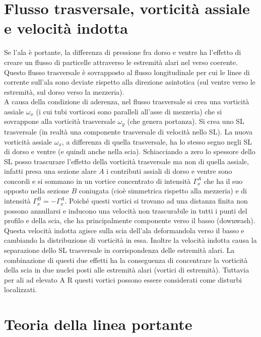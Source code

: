 \documentclass[11pt,a4paper]{report}
\newcommand{\sz}[1]{\scriptsize #1\normalsize}
\begin{document}
	\section{Flusso trasversale, vorticità assiale e velocità indotta}
	Se l'ala è portante, la differenza di pressione fra dorso e ventre ha l'effetto di creare un flusso di particelle attraverso le estremità alari nel verso coerente. Questo flusso trasversale è sovrapposto al flusso longitudinale per cui le linee di corrente sull'ala sono deviate rispetto alla direzione asintotica \sz{(sul ventre verso le estremità, sul dorso verso la mezzeria)}.\\
	A causa della condizione di aderenza, nel flusso trasversale si crea una vorticità assiale $\omega_x$ (i cui tubi vorticosi sono paralleli all'asse di mezzeria) che si sovrappone alla vorticità trasversale $\omega_y$ \sz{(che genera portanza)}. Si crea uno SL trasversale \sz{(in realtà una componente trasversale di velocità nello SL)}. La nuova vorticità assiale $\omega_x$, a differenza di quella trasversale, ha lo stesso segno negli SL di dorso e ventre (e quindi anche nella scia). Schiacciando a zero lo spessore dello SL posso trascurare l'effetto della vorticità trasversale ma non di quella assiale, infatti presa una sezione alare $A$ i contributi assiali di dorso e ventre sono concordi e si sommano in un vortice concentrato  di intensità $\Gamma_x^A$ che ha il suo opposto nella sezione $B$ coniugata \sz{(cioè simmetrica rispetto alla mezzeria)} e di intensità $\Gamma_x^B=-\Gamma_x^A$. Poiché questi vortici si trovano ad una distanza finita non possono annullarsi e inducono una velocità non trascurabile in tutti i punti del profilo e della scia, che ha principalmente componente verso il basso (downwash). Questa velocità indotta agisce sulla scia dell'ala deformandola verso il basso e cambiando la distribuzione di vorticità in essa. Inoltre la velocità indotta causa la separazione dello SL trasversale in corrispondenza delle estremità alari. La combinazione di questi due effetti ha la conseguenza di concentrare la vorticità della scia in due nuclei posti alle estremità alari (vortici di estremità). Tuttavia per ali ad elevato A\! R questi vortici possono essere considerati come disturbi localizzati.
	
	\section{Teoria della linea portante}
\end{document}

